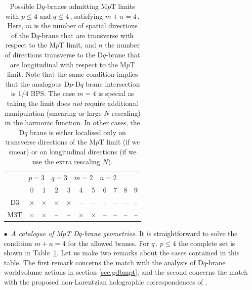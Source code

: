 \documentclass[11pt]{article}
\renewcommand{\emph}[1]{\textit{#1}}
\begin{document}
\begin{table}[ht!]
\vspace{1em}
\begin{tabular}{ccccccccccc}
\multicolumn{11}{c}{\!\quad\quad\quad$\boxed{p=3 \quad q=3 \quad m=2 \quad n=2}$}\\[2pt]
& 0 & 1 & 2 & 3 & 4 & 5 & 6 & 7 & 8 & 9 \\
D3& $\times$ & $\times$ & $\times$ & $\times$ & -- & -- & -- & -- & -- & -- \\
M$3$T& $\times$ & $\times$ & -- & -- & $\times$  & $\times$ & -- & -- & -- & -- \\
\end{tabular} \hspace{6.6cm}
\caption{Possible D$q$-branes admitting M$p$T limits with $p\leq 4$ and $q \leq 4$\,, satisfying $m + n = 4$\,. Here, $m$ is the number of spatial directions of the D$q$-brane that are transverse with respect to the M$p$T limit, and $n$ the number of directions transverse to the D$q$-brane that are longitudinal with respect to the M$p$T limit. 
Note that the same condition implies that the analogous D$p$-D$q$ brane intersection is 1/4 BPS.
The case $m=4$ is special as taking the limit does \emph{not} require additional manipulation (smearing or large $N$ rescaling) in the harmonic function. 
In other cases, the D$q$ brane is either localised only on transverse directions of the M$p$T limit (if we smear) or on longitudinal directions (if we use the extra rescaling $N$).
}
\addtolength{\tabcolsep}{2pt}  
\label{tab:IIbranes}
\end{table}

\vspace{3mm}
\noindent $\bullet$~\emph{A catalogue of M$p$T D$q$-brane geometries.}
It is straightforward to solve the condition $m + n = 4$ for the allowed branes.
For $q\,,\,p\leq 4$ the complete set is shown in Table~\ref{tab:IIbranes}.
Let us make two remarks about the cases contained in this table.
The first remark concerns the match with the analysis of D$q$-brane worldvolume actions in section \ref{sec:gdbmpt}, and the second concerns the match with the proposed non-Lorentzian holographic correspondences of \cite{Lambert:2024yjk}.
\end{document}
